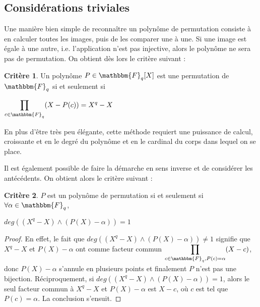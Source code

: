 \documentclass[12pt]{article}
\theoremstyle{remark}\newtheorem{note}{Note}
\theoremstyle{remark}\newtheorem{nota}{Notation}
\newcommand{\Fq}{\mathbbm{F}_q}
\theoremstyle{definition}
\newtheorem{crit}{Critère}
\begin{document}
\subsection{Considérations triviales}
Une manière bien simple de reconnaître un polynôme de permutation consiste à en calculer toutes les images, puis de les comparer une à une. Si une image est égale à une autre, i.e. l'application n'est pas injective, alors le polynôme ne sera pas de permutation. On obtient dès lors le critère suivant :
\begin{crit}
Un polynôme $P \in \Fq[X]$ est une permutation de $\Fq$ si et seulement si \begin{center}$\displaystyle\prod_{c \in \Fq}(X-P(c)) = X^q -X$ \end{center}
\end{crit}
En plus d'être très peu élégante, cette méthode requiert une puissance de calcul, croissante et en le degré du polynôme et en le cardinal du corps dans lequel on se place. 

Il est également possible de faire la démarche en sens inverse et de considérer les antécédents. On obtient alors le critère suivant :

\begin{crit}
$P$ est un polynôme de permutation si et seulement si $\forall \alpha \in \Fq$, 
\begin{center}$deg((X^q -X) \wedge (P(X)-\alpha)) = 1$\end{center}
\end{crit}

\begin{proof}
En effet, le fait que $deg((X^q -X) \wedge (P(X)-\alpha)) \neq 1$ signifie que $X^q - X$ et $P(X)-\alpha$ ont comme facteur commun $\displaystyle\prod_{c \in \Fq, P(c)=\alpha}(X-c)$, donc $P(X)-\alpha$ s'annule en plusieurs points et finalement $P$ n'est pas une bijection. \newline
Réciproquement, si $deg((X^q-X) \wedge (P(X)-\alpha))=1$, alors le seul facteur commun à $X^q-X$ et $P(X)-\alpha$ est $X-c$, où $c$ est tel que $P(c)=\alpha$. La conclusion s'ensuit.
\end{proof}
\end{document}
